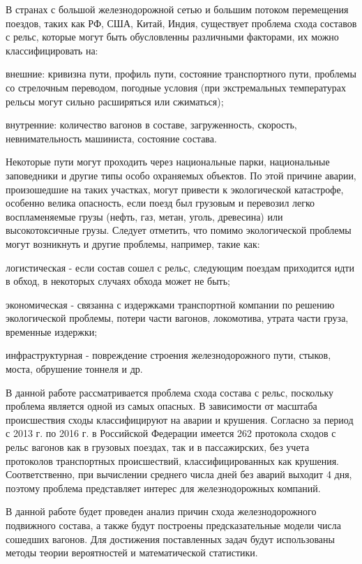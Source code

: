 В странах с большой железнодорожной сетью и большим потоком перемещения поездов, таких как РФ, США, Китай, Индия, существует проблема схода составов с рельс, которые могут быть обусловленны различными факторами, их можно классифицировать на:

\begin{description}[font=$\bullet$]
\item внешние: кривизна пути, профиль пути, состояние транспортного пути, проблемы со стрелочным переводом, погодные условия (при экстремальных температурах рельсы могут сильно расширяться или сжиматься);
    
\item внутренние: количество вагонов в составе, загруженность, скорость, невнимательность машиниста, состояние состава.
\end{description}
Некоторые пути могут проходить через национальные парки, национальные заповедники и другие типы особо охраняемых объектов. По этой причине аварии, произошедшие на таких участках, могут привести к экологической катастрофе, особенно велика опасность, если поезд был грузовым и перевозил легко воспламеняемые грузы (нефть, газ, метан, уголь, древесина) или высокотоксичные грузы. Следует отметить, что помимо экологической проблемы могут возникнуть и другие проблемы, например, такие как:

\begin{description}[font=$\bullet$]
\item логистическая - если состав сошел с рельс, следующим поездам приходится идти в обход, в некоторых случаях обхода может не быть;
\item экономическая - связанна с издержками транспортной компании по решению экологической проблемы, потери части вагонов, локомотива, утрата части груза, временные издержки;
\item инфраструктурная - повреждение строения железнодорожного пути, стыков, моста, обрушение тоннеля и др.
\end{description}
В данной работе рассматривается проблема схода состава с рельс, поскольку проблема является одной из самых опасных. В зависимости от масштаба происшествия сходы классифицируют на аварии и крушения. Согласно \cite{Ignatov:functional_dependence} за период с 2013 г. по 2016 г. в Российской Федерации имеется 262 протокола сходов с рельс вагонов как в грузовых поездах, так и в пассажирских, без учета протоколов транспортных происшествий, классифицированных как крушения. Соответственно, при вычислении среднего числа дней без аварий выходит 4 дня, поэтому проблема представляет интерес для железнодорожных компаний.

В данной работе будет проведен анализ причин схода железнодорожного подвижного состава, а также будут построены предсказательные модели числа сошедших вагонов. Для достижения поставленных задач будут использованы методы теории вероятностей и математической статистики.

